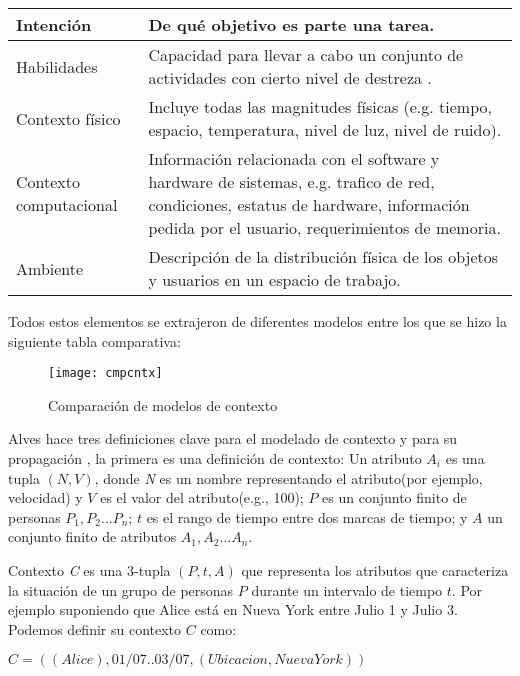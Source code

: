 \begin{center}
\begin{longtable}{|p{3cm}|p{10cm}|}
	\hline
	Intenci\'on & De qu\'e objetivo es parte una tarea\cite{gallardo2012framework}. \\
	\hline
	Habilidades & Capacidad para llevar a cabo un conjunto de actividades con cierto nivel de destreza \cite{decouchant2013adapting}. \\
	\hline
	Contexto f\'isico & Incluye todas las magnitudes f\'isicas (e.g. tiempo, espacio, temperatura, nivel de luz, nivel de ruido)\cite{hoyos2013domain}. \\
	\hline
	Contexto computacional & Informaci\'on relacionada con el software y hardware de sistemas, e.g. trafico de red, condiciones, estatus de hardware, informaci\'on pedida por el usuario, requerimientos de memoria\cite{hoyos2013domain}. \\
	\hline
	Ambiente & Descripci\'on de la distribuci\'on f\'isica de los objetos y usuarios en un espacio de trabajo\cite{hoyos2013domain}. \\
	\hline
\end{longtable}
\end{center}

Todos estos elementos se extrajeron de diferentes modelos entre los que se hizo la siguiente tabla comparativa:

\begin{figure}[h!]
  \centering
    \texttt{[image: cmpcntx]}
  \caption{Comparaci\'on de modelos de contexto\cite{ellis1994conceptual}\cite{montane2013context}\cite{gallardo2012framework}}
\end{figure}

Alves hace tres definiciones clave para el modelado de contexto y para su propagaci\'on \cite{alves2013radiator}, la primera es una definici\'on de contexto: Un atributo $A_{i}$ es una tupla $( N, V )$, donde \textit{N} es un nombre representando el atributo(por ejemplo, velocidad) y $V$ es el valor del atributo(e.g., 100); $P$ es un conjunto finito de personas ${P_{1},P_{2}...P_{n}}$; $t$ es el rango de tiempo entre dos marcas de tiempo; y $\textit{A}$ un conjunto finito de atributos ${A_{1},A_{2}...A_{n}}$.

Contexto \textit{C} es una 3-tupla $( P, t, A )$ que representa los atributos que caracteriza la situaci\'on de un grupo de personas $P$ durante un intervalo de tiempo $t$. Por ejemplo suponiendo que Alice est\'a en Nueva York entre Julio 1 y Julio 3. Podemos definir su contexto $C$ como:

$C=( ( Alice ), 01/07..03/07, ( Ubicacion, Nueva York ))$

